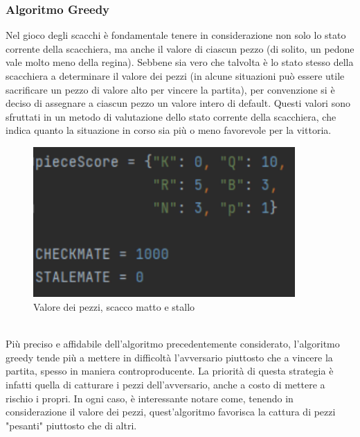 \subsubsection{Algoritmo Greedy}
Nel gioco degli scacchi è fondamentale tenere in considerazione non solo lo stato corrente della scacchiera, ma anche il valore di ciascun pezzo (di solito, un pedone vale molto meno della regina). Sebbene sia vero che talvolta è lo stato stesso della scacchiera a determinare il valore dei pezzi (in alcune situazioni può essere utile sacrificare un pezzo di valore alto per vincere la partita), per convenzione si è deciso di assegnare a ciascun pezzo un valore intero di default. Questi valori sono sfruttati in un metodo di valutazione dello stato corrente della scacchiera, che indica quanto la situazione in corso sia più o meno favorevole per la vittoria.
\begin{figure}[!htb]
    \includegraphics[width=10cm]{frontmatter/figure/valore_pezzi.pdf}
    \centering
    \caption{Valore dei pezzi, scacco matto e stallo}
    \label{fig:valore_pezzi}
\end{figure}\\

Più preciso e affidabile dell'algoritmo precedentemente considerato, l'algoritmo greedy tende più a mettere in difficoltà l'avversario piuttosto che a vincere la partita, spesso in maniera controproducente. La priorità di questa strategia è infatti quella di catturare i pezzi dell'avversario, anche a costo di mettere a rischio i propri. In ogni caso, è interessante notare come, tenendo in considerazione il valore dei pezzi, quest'algoritmo favorisca la cattura di pezzi "pesanti" piuttosto che di altri. 
